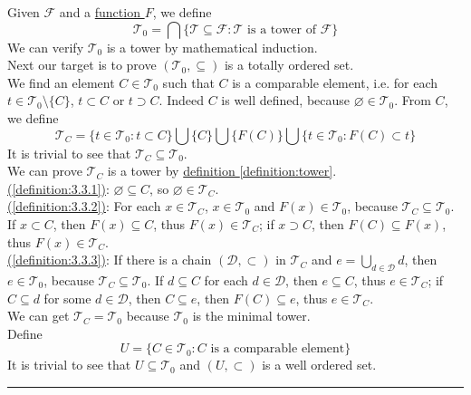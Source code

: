 \documentclass{article}
\numberwithin{equation}{section}
\theoremstyle{plain} %
\theoremstyle{definition}
\theoremstyle{remark}
\newenvironment{proof}{{\bf Proof:}}{\hfill\rule{2mm}{2mm}}
\begin{document}
\begin{proof}
Given $\mathcal{F}$ and a \hyperref[definition:B_star]{function $F$}, we define 
$$\mathcal{T}_0 = \bigcap \{ \mathcal{T} \subseteq  \mathcal{F}: \mathcal{T} \text{ is a tower of }\mathcal{F}\}$$
We can verify $\mathcal{T}_0$ is a tower by mathematical induction. \\
Next our target is to prove $(\mathcal{T}_0, \subseteq)$ is a totally ordered set.     \\
We find an element $C \in \mathcal{T}_0$ such that $C$ is a comparable element, i.e. for each $t \in \mathcal{T}_0 \setminus \{{C}\}$, $t \subset {C}$ or $t \supset {C}$. Indeed $C$ is well defined, because $\varnothing \in \mathcal{T}_0$. From ${C}$, we define 
$$\mathcal{T}_C = \{ t \in \mathcal{T}_0: t \subset C \} \bigcup \{ C \} \bigcup \{ F(C) \} \bigcup \{ t \in \mathcal{T}_0: F(C) \subset t \}$$
It is trivial to see that $\mathcal{T}_C \subseteq \mathcal{T}_0$. \\
We can prove $\mathcal{T}_C$ is a tower by \hyperref[definition:tower]{definition  \ref*{definition:tower}}.  \\
\hyperref[definition:3.3.1]{(\ref*{definition:3.3.1})}: $\varnothing \subseteq C$, so $\varnothing \in \mathcal{T}_C$. \\  
\hyperref[definition:3.3.2]{(\ref*{definition:3.3.2})}: For each $x \in \mathcal{T}_C$, $x \in \mathcal{T}_0$ and $F(x) \in \mathcal{T}_0$, because $\mathcal{T}_C \subseteq \mathcal{T}_0$. If $x \subset C$, then $F(x) \subseteq C$, thus $F(x) \in \mathcal{T}_C$; if $x \supset C $, then $F(C) \subseteq F(x)$, thus $F(x) \in \mathcal{T}_C$. \\
\hyperref[definition:3.3.3]{(\ref*{definition:3.3.3})}: If there is a chain $(\mathcal{D}, \subset)$ in $\mathcal{T}_C$ and $e = \bigcup_{d \in \mathcal{D}}d $, then $e \in \mathcal{T}_0$, because $\mathcal{T}_C \subseteq \mathcal{T}_0$. If $d \subseteq C$ for each $d \in \mathcal{D}$, then $e \subseteq C$, thus $e \in \mathcal{T}_C$; if $C \subseteq d$ for some $d \in \mathcal{D}$, then $C \subseteq e$, then $F(C) \subseteq e$, thus $e \in \mathcal{T}_C$. \\
We can get $\mathcal{T}_C = \mathcal{T}_0$ because $\mathcal{T}_0$ is the minimal tower.  \\
Define \\
$$U = \{ C \in \mathcal{T}_0: C \text{ is a comparable element}\}$$
It is trivial to see that $U \subseteq \mathcal{T}_0$ and $(U, \subset)$ is a well ordered set. \\

\end{proof}
\end{document}

